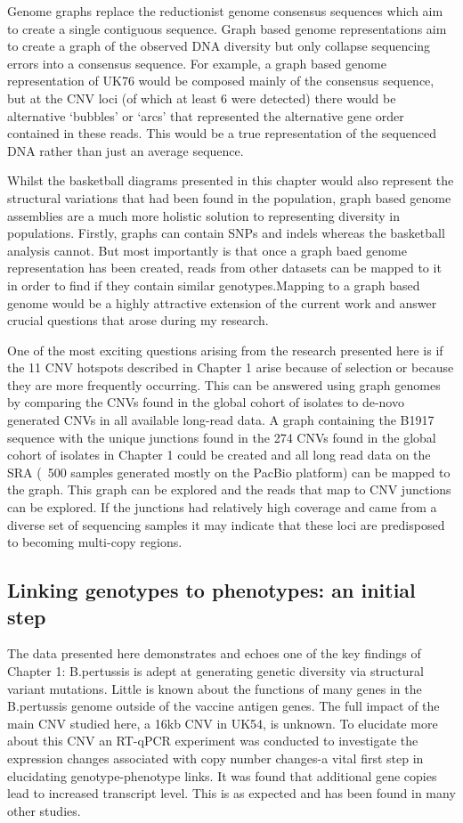 \documentclass{article}
\begin{document}
Genome graphs replace the reductionist genome consensus sequences which aim to create a single contiguous sequence. Graph based genome representations aim to create a graph of the observed DNA diversity but only collapse sequencing errors into a consensus sequence. For example, a graph based genome representation of UK76 would be composed mainly of the consensus sequence, but at the CNV loci (of which at least 6 were detected) there would be alternative `bubbles' or `arcs' that represented the alternative gene order contained in these reads. This would be a true representation of the sequenced DNA rather than just an average sequence.

Whilst the basketball diagrams presented in this chapter would also represent the structural variations that had been found in the population, graph based genome assemblies are a much more holistic solution to representing diversity in populations. Firstly, graphs can contain SNPs and indels whereas the basketball analysis cannot. But most importantly is that once a graph baed genome representation has been created, reads from other datasets can be mapped to it in order to find if they contain similar genotypes.Mapping to a graph based genome would be a highly attractive extension of the current work and answer crucial questions that arose during my research. 

One of the most exciting questions arising from the research presented here is if the 11 CNV hotspots described in Chapter 1 arise because of selection or because they are more frequently occurring. This can be answered using graph genomes by comparing the CNVs found in the global cohort of isolates to de-novo generated CNVs in all available long-read data. A graph containing the B1917 sequence with the unique junctions found in the 274 CNVs found in the global cohort of isolates in Chapter 1 could be created and all long read data on the SRA (~500 samples generated mostly on the PacBio platform) can be mapped to the graph. This graph can be explored and the reads that map to CNV junctions can be explored. If the junctions had relatively high coverage and came from a diverse set of sequencing samples it may indicate that these loci are predisposed to becoming multi-copy regions.

\subsection{Linking genotypes to phenotypes: an initial step}

The data presented here demonstrates and echoes one of the key findings of Chapter 1: B.pertussis is adept at generating genetic diversity via structural variant mutations. Little is known about the functions of many genes in the B.pertussis genome outside of the vaccine antigen genes. The full impact of the main CNV studied here, a 16kb CNV in UK54, is unknown. To elucidate more about this CNV an RT-qPCR experiment was conducted to investigate the expression changes associated with copy number changes-a vital first step in elucidating genotype-phenotype links. It was found that additional gene copies lead to increased transcript level. This is as expected and has been found in many other studies. 
\end{document}
